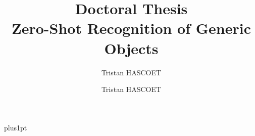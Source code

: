\documentclass[twoside,12pt]{Latex/Classes/PhDthesisPSnPDF}
\title{{\Huge\textbf{ Doctoral Thesis }}\\
\vspace{10mm}
  {\LARGE \bfseries Zero-Shot Recognition of Generic Objects}\\
}
\author{Tristan HASCOET}
\author{Tristan HASCOET}
\begin{document}
\renewcommand\baselinestretch{1.2}
\baselineskip=18pt plus1pt


\maketitle  %







\end{document}
